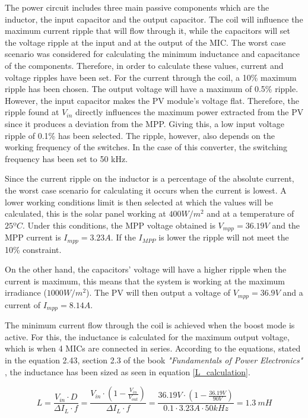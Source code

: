 The power circuit includes three main passive components which are the inductor, the input capacitor and the output capacitor. The coil will influence the maximum current ripple that will flow through it, while the capacitors will set the voltage ripple at the input and at the output of the MIC. The worst case scenario was considered for calculating the minimum inductance and capacitance of the components.
\label{sec:componentsizing}
Therefore, in order to calculate these values, current and voltage ripples have been set. For the current through the coil, a 10\% maximum ripple has been chosen. The output voltage will  have a maximum of 0.5\% ripple. However, the input capacitor makes the PV module's voltage flat. Therefore, the ripple found at $V_{in}$ directly influences the maximum power extracted from the PV since it produces a deviation from the MPP. Giving this, a low input voltage ripple of 0.1\% has been selected. The ripple, however, also depends on the working frequency of the switches. In the case of this converter, the switching frequency has been set to 50 kHz. 

Since the current ripple on the inductor is a percentage of the absolute current, the worst case scenario for calculating it occurs when the current is lowest. A lower working conditions limit is then selected at which the values will be calculated, this is the solar panel working at $400 W/m^2$ and at a temperature of $25 ºC$. Under this conditions, the MPP voltage obtained is $V_{mpp} = 36.19 V$ and the MPP current is $I_{mpp} = 3.23A$. If the $I_{MPP}$ is lower the ripple will not meet the 10\% constraint.

On the other hand, the capacitors' voltage will have a higher ripple when the current is maximum, this means that the system is working at the maximum irradiance ($1000 W/m^2$). The PV will then output a voltage of $V_{mpp} = 36.9 V$ and a current of $I_{mpp} = 8.14 A$.

The minimum current flow through the coil is achieved when the boost mode is active. For this, the inductance is calculated for the maximum output voltage, which is when 4 MICs are connected in series. According to the equations, stated in the equation 2.43, section 2.3 of the book \textit{"Fundamentals of Power Electronics"} \cite{Erickson}, the inductance has been sized as seen in equation \ref{L_calculation}.

\begin{equation} \label{L_calculation}
L = \frac{V_{in} \cdot D}{\Delta I_{L} \cdot f} = \frac{V_{in} \cdot (1 -  \frac{V_{in}}{V_{out}})}{\Delta I_{L} \cdot f} =  \frac{36.19 V \cdot (1-\frac{36.19V}{90V})}{0.1 \cdot 3.23 A \cdot 50 kHz} = 1.3 \ mH
\end{equation}

